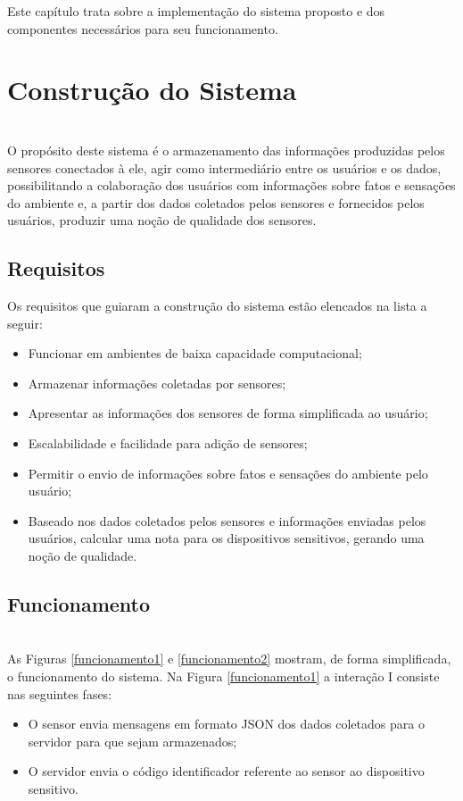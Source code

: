 
\quad Este capítulo trata sobre a implementação do sistema proposto e dos componentes necessários para seu funcionamento.
\section{Construção do Sistema}
\\\null \quad O propósito deste sistema é o armazenamento das informações produzidas pelos sensores conectados à ele, agir como intermediário entre os usuários e os dados, possibilitando a colaboração dos usuários com informações sobre fatos e sensações do ambiente e, a partir dos dados coletados pelos sensores e fornecidos pelos usuários, produzir uma noção de qualidade dos sensores.

\subsection{Requisitos}
\null \quad Os requisitos que guiaram a construção do sistema estão elencados na lista a seguir:
\begin{itemize}
  \item Funcionar em ambientes de baixa capacidade computacional;
  \item Armazenar informações coletadas por sensores;
  \item Apresentar as informações dos sensores de forma simplificada ao usuário;
  \item Escalabilidade e facilidade para adição de sensores;
  \item Permitir o envio de informações sobre fatos e sensações do ambiente pelo usuário;
  \item Baseado nos dados coletados pelos sensores e informações enviadas pelos usuários, calcular uma nota para os dispositivos sensitivos, gerando uma noção de qualidade.
\end{itemize}

\subsection{Funcionamento}
\\\null \quad As Figuras \ref{funcionamento1} e \ref{funcionamento2} mostram, de forma simplificada, o funcionamento do sistema. Na Figura \ref{funcionamento1} a interação I consiste nas seguintes fases:

\begin{itemize}
  \item O sensor envia mensagens em formato JSON dos dados coletados para o servidor para que sejam armazenados;
  \item O servidor envia o código identificador referente ao sensor ao dispositivo sensitivo.
\end{itemize}

